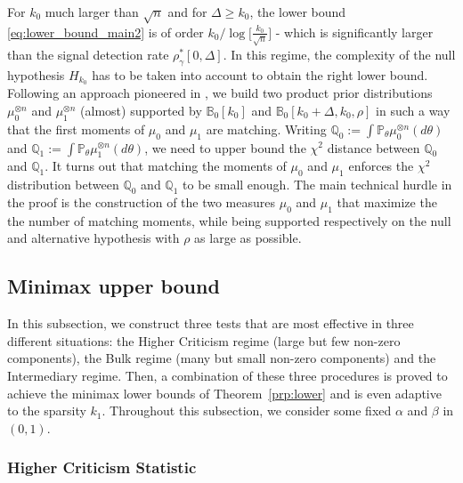 \documentclass[twoside,11pt]{article}
\def\bbB{\mathbb{B}}
\def\bbQ{\mathbb{Q}}
\newcommand{\<}{\langle}
\renewcommand{\>}{\rangle}
\begin{document}
For  $k_0$ much larger than  $\sqrt{n}$ and for $\Delta\geq k_0$, the lower bound \eqref{eq:lower_bound_main2} is of order $k_0/\log\big[ \tfrac{k_0}{\sqrt{n}}\big]$  - which is significantly larger than the signal detection rate $\rho^*_{\gamma}[0,\Delta]$. In this regime, the complexity of the null hypothesis $H_{k_0}$ has to be taken into account to obtain the right lower bound. Following an approach pioneered in \cite{lepski1999estimation}, we build two product prior distributions $\mu_0^{\otimes n}$ and $\mu_1^{\otimes n}$ (almost) supported by $\bbB_0[k_0]$ and $\bbB_0[k_0+\Delta,k_0,\rho]$ in such a way that the first moments of $\mu_0$ and $\mu_1$ are matching. Writing $\bbQ_{0}:= \int \mathbb{P}_{\theta}\mu_0^{\otimes n}(d\theta)$ and $\bbQ_{1}:= \int \mathbb{P}_{\theta}\mu_1^{\otimes n}(d\theta)$, we need to upper bound the $\chi^2$ distance between $\bbQ_0$ and $\bbQ_1$. It turns out that matching the moments of $\mu_0$ and $\mu_1$ enforces the $\chi^2$ distribution between $\bbQ_0$ and $\bbQ_1$ to be small enough. The main technical hurdle in the proof is the construction of the two measures $\mu_0$ and $\mu_1$ that maximize the the number of matching moments, while being supported respectively on the null and alternative hypothesis with $\rho$ as large as possible.


\subsection{Minimax upper bound}\label{sec:ubkv}




In this subsection, we construct three tests that are most effective in three different situations: the Higher Criticism regime (large but few non-zero components), the Bulk regime (many but small non-zero components) and the Intermediary regime. Then, a combination of these three procedures is proved to achieve the minimax lower bounds of Theorem~\ref{prp:lower} and is even adaptive to the sparsity $k_1$. 
Throughout this subsection, we consider some fixed $\alpha$ and $\beta$ in $(0,1)$. 

\subsubsection{Higher Criticism Statistic}\label{sec:HCKV}
\end{document}
